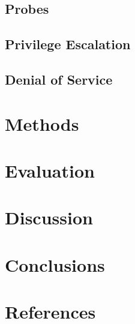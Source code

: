 \documentclass{acm_proc_article-sp}
\begin{document}
    \subsection{Probes}
    \subsection{Privilege Escalation}
    \subsection{Denial of Service}

\section{Methods}

\section{Evaluation}

\section{Discussion}

\section{Conclusions}

\section{References}
	

{}  %
\nocite{*}
%
%
\balancecolumns
\end{document}
